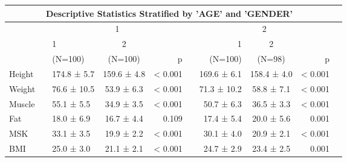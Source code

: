 \begin{table}[!hbtp]
\begin{center}
\begin{normalsize}
\color{black}
\begin{tabular}{lclcrcrcrc}
\multicolumn{9}{c}{Descriptive Statistics Stratified by 'AGE' and 'GENDER'}\\ 
\hline
\multicolumn{1}{c}{}&&\multicolumn{3}{c}{1}&&\multicolumn{3}{c}{2}\\ 
\cline{3-5}\cline{7-9}
\multirow{2}{*}{}&&1&2&&&1&2&\\ 
\multirow{-2}{*}{}&&(N=100)&(N=100)&\multirow{-2}{*}{p}&&(N=100)&(N=98)&\multirow{-2}{*}{p}\\ 
\hline
Height&&174.8 ±  5.7&159.6 ±  4.8&< 0.001&&169.6 ±  6.1&158.4 ±  4.0&< 0.001\\ 
Weight&&76.6 ± 10.5&53.9 ±  6.3&< 0.001&&71.3 ± 10.2&58.8 ±  7.1&< 0.001\\ 
Muscle&&55.1 ±  5.5&34.9 ±  3.5&< 0.001&&50.7 ±  6.3&36.5 ±  3.3&< 0.001\\ 
Fat   &&18.0 ±  6.9&16.7 ±  4.4&0.109&&17.4 ±  5.4&20.0 ±  5.6&0.001\\ 
MSK   &&33.1 ±  3.5&19.9 ±  2.2&< 0.001&&30.1 ±  4.0&20.9 ±  2.1&< 0.001\\ 
BMI   &&25.0 ±  3.0&21.1 ±  2.1&< 0.001&&24.7 ±  2.9&23.4 ±  2.5&0.001\\ 
\hline
\end{tabular}
\end{normalsize}
\end{center}
\end{table}
\color{black}